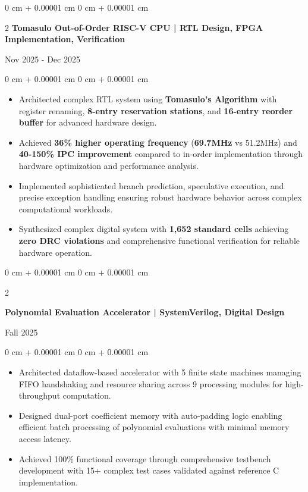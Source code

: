 \documentclass[10pt, letterpaper]{article}
\newenvironment{highlights}{
    \begin{itemize}[
        topsep=0.05 cm,
        parsep=0.05 cm,
        partopsep=0pt,
        itemsep=0pt,
        leftmargin=0 cm + 10pt
    ]
}{
    \end{itemize}
}
\newenvironment{onecolentry}{
    \begin{adjustwidth}{
        0 cm + 0.00001 cm
    }{
        0 cm + 0.00001 cm
    }
}{
    \end{adjustwidth}
}
\newenvironment{twocolentry}[2][]{
    \onecolentry
    \def\secondColumn{#2}
    \setcolumnwidth{\fill, 4.5 cm}
    \begin{paracol}{2}
}{
    \switchcolumn \raggedleft \secondColumn
    \end{paracol}
    \endonecolentry
}
\begin{document}
        \vspace{0.10 cm}
        \begin{twocolentry}{
            Nov 2025 - Dec 2025 } \textbf{Tomasulo Out-of-Order RISC-V CPU | RTL Design, FPGA Implementation, Verification}
        \end{twocolentry}
        \vspace{0.05 cm}
        \begin{onecolentry}
            \begin{highlights}
                \item Architected complex RTL system using \textbf{Tomasulo's Algorithm} with register renaming, \textbf{8-entry reservation stations}, and \textbf{16-entry reorder buffer} for advanced hardware design.
                \item Achieved \textbf{36\% higher operating frequency} (\textbf{69.7MHz} vs 51.2MHz) and \textbf{40-150\% IPC improvement} compared to in-order implementation through hardware optimization and performance analysis.
                \item Implemented sophisticated branch prediction, speculative execution, and precise exception handling ensuring robust hardware behavior across complex computational workloads.
                \item Synthesized complex digital system with \textbf{1,652 standard cells} achieving \textbf{zero DRC violations} and comprehensive functional verification for reliable hardware operation.
            \end{highlights}
        \end{onecolentry}

        \vspace{0.10 cm}

        \begin{twocolentry}{
            Fall 2025
        }
            \textbf{Polynomial Evaluation Accelerator | SystemVerilog, Digital Design}
        \end{twocolentry}
        \vspace{0.05 cm}
        \begin{onecolentry}
            \begin{highlights}
                \item Architected dataflow-based accelerator with 5 finite state machines managing FIFO handshaking and resource sharing across 9 processing modules for high-throughput computation.
                \item Designed dual-port coefficient memory with auto-padding logic enabling efficient batch processing of polynomial evaluations with minimal memory access latency.
                \item Achieved 100\% functional coverage through comprehensive testbench development with 15+ complex test cases validated against reference C implementation.
            \end{highlights}
        \end{onecolentry}
\end{document}
